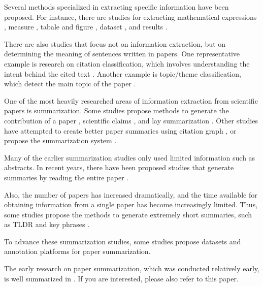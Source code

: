 \documentclass{book}
\begin{document}
Several methods specialized in extracting specific information have been proposed. For instance, there are studies for extracting mathematical expressions \cite{greiner2020math,madisetty2021neural}, measure \cite{harper2021semeval,kohler2021s}, tabale and figure \cite{shen2022vila,hashmi2021current,zhuang2022resel,yamamoto2021visual}, dataset \cite{hou2019identification,kumar2021dataquest,prasad2019dataset}, and results \cite{kardas2020axcell}.

There are also studies that focus not on information extraction, but on determining the meaning of sentences written in papers. One representative example is research on citation classification, which involves understanding the intent behind the cited text \cite{pride2019act,kunnath2021meta,kunnath2022dynamic,kunnath2022act2,lauscher2021multicite}. Another example is topic/theme classification, which detect the main topic of the paper \cite{sadat2022hierarchical,mendoza2022benchmark,salatino2022cso}.

One of the most heavily researched areas of information extraction from scientific papers is summarization. Some studies propose methods to generate the contribution of a paper \cite{hayashi2020s}, scientific claims \cite{wright2022generating}, and lay summarization \cite{goldsack2022making}. Other studies have attempted to create better paper summaries using citation graph \cite{chen2022scientific,an2021enhancing}, or propose the summarization system \cite{erera2019summarization}.

Many of the earlier summarization studies only used limited information such as abstracts. In recent years, there have been proposed studies that generate summaries by reading the entire paper \cite{subramanian2019extractive,qi2022sapgraph,dong2020discourse,tretyak2020combination}.

Also, the number of papers has increased dramatically, and the time available for obtaining information from a single paper has become increasingly limited. Thus, some studies propose the methods to generate extremely short summaries, such as TLDR \cite{cachola2020tldr} and key phrases \cite{boudin2021keyphrase,garg2021keyphrase}.

To advance these summarization studies, some studies propose datasets \cite{yasunaga2019scisummnet,bastan2022sume} and annotation platforms \cite{el2022platform} for paper summarization. 

The early research on paper summarization, which was conducted relatively early, is well summarized in \cite{altmami2022automatic}. If you are interested, please also refer to this paper.
\end{document}
